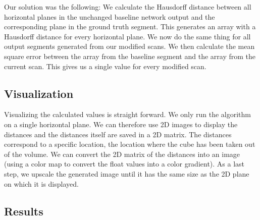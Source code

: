 Our solution was the following: We calculate the Hausdorff distance between all horizontal planes in the unchanged baseline network output and the corresponding plane in the ground truth segment.
This generates an array with a Hausdorff distance for every horizontal plane. We now do the same thing for all output segments generated from our modified scans. We then calculate the mean square error between the array from the baseline segment and the array from the current scan. This gives us a single value for every modified scan.

\subsection{Visualization}
Visualizing the calculated values is straight forward. We only run the algorithm on a single horizontal plane. We can therefore use 2D images to display the distances and the distances itself are saved in a 2D matrix. The distances correspond to a specific location, the location where the cube has been taken out of the volume. We can convert the 2D matrix of the distances into an image (using a color map to convert the float values into a color gradient). As a last step, we upscale the generated image until it has the same size as the 2D plane on which it is displayed.

\subsection{Results}

